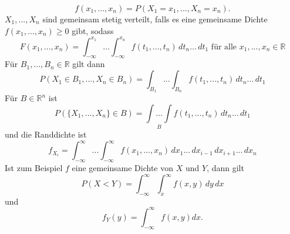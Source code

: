 \documentclass[a4paper,12pt]{article}
\begin{document}
$$
	f(x_1, ..., x_n) = P(X_1=x_1, ..., X_n=x_n)
	.$$
$X_1, ..., X_n$ sind gemeinsam stetig verteilt, falls es eine gemeinsame Dichte $f(x_1, ...,x_n) \geq 0$ gibt, sodass
$$
	F(x_1, ..., x_n) = \int_{-\infty}^{x_1} \dots \int_{-\infty}^{x_n}f(t_1, ..., t_n) \,dt_n \dots \,dt_1 \text{ für alle } x_1, ..., x_n \in \mathbb{R}
$$
Für $B_1, ..., B_n \in \mathbb{R}$ gilt dann
$$
	P(X_1 \in B_1, ..., X_n \in B_n) = \int_{B_1} ... \int_{B_n} f(t_1, ..., t_n) \, dt_n ... \, dt_1
$$
Für $B \in \mathbb{R}^n$ ist
$$
	P \left(  \{X_1, ..., X_n\} \in B   \right) = \underset{B}{\int \dots \int} f(t_1, ..., t_n) \, dt_n ... \, dt_1
$$
und die Randdichte ist
$$
	f_{X_i} = \int_{-\infty}^{\infty} ...\int_{-\infty}^{\infty} f(x_1, ..., x_n) \,dx_1 ... \, dx_{i-1} \, dx_{i+1} ... \, dx_n
$$
Ist zum Beispiel $f$ eine gemeinsame Dichte von $X$ und $Y$, dann gilt
$$
	P(X < Y) = \int_{-\infty}^{\infty} \int_{x}^{\infty} f(x,y) \, dy \, dx
$$
und
$$
	f_Y(y) = \int_{-\infty}^{\infty} f(x,y) dx
	.$$
\end{document}
